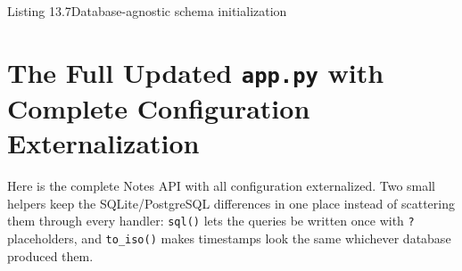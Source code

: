 \begin{codeboxcap}{\textcolor{accent}{Listing 13.7}\enspace Database-agnostic schema initialization}

\begin{Shaded}
\begin{Highlighting}[]
\NormalTok{):}
\OperatorTok{=}
\OperatorTok{=}

    \NormalTok{):}
\StringTok{            )}
\NormalTok{)}
    \NormalTok{:}
\StringTok{            )}
\NormalTok{)}

\end{Highlighting}
\end{Shaded}

\end{codeboxcap}

\setcounter{section}{5}
\section{\texorpdfstring{The Full Updated \texttt{app.py} with Complete Configuration
Externalization}{The Full Updated app.py with Complete Configuration Externalization}}\label{13-configuration-externalization:136-the-full-updated-apppy-with-complete-configuration-externalization}

Here is the complete Notes API with all configuration externalized. Two small helpers keep the SQLite/PostgreSQL differences in one place instead of scattering them through every handler: \texttt{sql()} lets the queries be written once with \texttt{?} placeholders, and \texttt{to\_iso()} makes timestamps look the same whichever database produced them.

